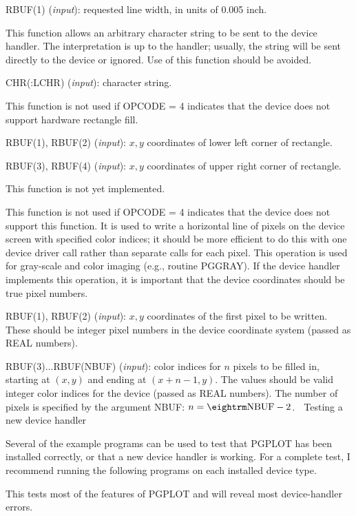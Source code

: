 RBUF(1) ({\it input\/}): requested line width, in units of 0.005 inch.


This function allows an arbitrary character string to be sent to the
device handler. The interpretation is up to the handler; usually, the 
string will be sent directly to the device or ignored. Use of this
function should be avoided. 

CHR(:LCHR) ({\it input\/}): character string.

This function is not used if OPCODE = 4 indicates that the device does not
support hardware rectangle fill. 

RBUF(1), RBUF(2) ({\it input\/}): $x,y$ coordinates of lower left
corner of rectangle.

RBUF(3), RBUF(4) ({\it input\/}): $x,y$ coordinates of upper right
corner of rectangle.

This function is not yet implemented.

This function is not used if OPCODE = 4 indicates that the device does not
support this function. It is used to write a horizontal line of pixels 
on the device screen with specified color indices; it should be more 
efficient to do this with one device driver call rather than separate 
calls for each pixel. This operation is used for gray-scale and color
imaging (e.g., routine PGGRAY). If the device handler implements this
operation, it is important that the device coordinates should be true
pixel numbers. 

RBUF(1), RBUF(2) ({\it input\/}): $x,y$ coordinates of the first pixel
to be written. These should be integer pixel numbers in the device 
coordinate system (passed as REAL numbers).

RBUF(3)...RBUF(NBUF) ({\it input\/}): color indices for $n$ pixels
to be filled in, starting at $(x,y)$ and ending at $(x+n-1,y)$. The
values should be valid integer color indices for the device (passed as 
REAL numbers). The number of pixels is specified by the argument NBUF:
$n= {\rm NBUF}-2$. 

\beginsection Testing a new device handler

Several of the example programs can be used to test that PGPLOT has been
installed correctly, or that a new device handler is working. For a
complete test, I recommend running the following programs on each
installed device type. 

This tests most of the features of PGPLOT and will reveal most
device-handler errors. 


